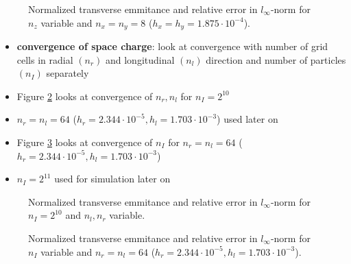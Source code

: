 \begin{center}
\begin{figure}[H]
   \begin{subfigure}{0.4\textwidth}
      
   \end{subfigure}
   \qquad \qquad \qquad
   \begin{subfigure}{0.4\textwidth}
      
   \end{subfigure}
   \caption{Normalized transverse emmitance and relative error in $l_\infty$-norm for $n_z$ variable and $n_x=n_y=8$ ($h_x=h_y=1.875 \cdot 10^{-4}$).}
   \label{fig:map_cvg_z}
\end{figure}
\end{center}

\newpage

\begin{itemize}
   \item \textbf{convergence of space charge}: look at convergence with number of grid cells in radial $(n_r)$ and longitudinal $(n_l)$ direction and number of particles $(n_I)$ separately

   \item Figure \ref{fig:sc_cvg_rl} looks at convergence of $n_r, n_l$ for $n_I=2^{10}$
   \item $n_r=n_l=64$ ($h_r=2.344 \cdot 10^{-5}, h_l=1.703 \cdot 10^{-3}$) used later on

   \item Figure \ref{fig:sc_cvg_I} looks at convergence of $n_I$ for $n_r=n_l=64$ ($h_r=2.344 \cdot 10^{-5}, h_l=1.703 \cdot 10^{-3}$)
   \item $n_I=2^{11}$ used for simulation later on
\end{itemize}

\begin{center}
\begin{figure}[H]
   \begin{subfigure}{0.4\textwidth}
      
   \end{subfigure}
   \qquad \qquad \qquad
   \begin{subfigure}{0.4\textwidth}
      
   \end{subfigure}
   \caption{Normalized transverse emmitance and relative error in $l_\infty$-norm for $n_I=2^{10}$ and $n_l, n_r$ variable.}
   \label{fig:sc_cvg_rl}
\end{figure}
\end{center}

\begin{center}
\begin{figure}[H]
   \begin{subfigure}{0.4\textwidth}
      
   \end{subfigure}
   \qquad \qquad \qquad
   \begin{subfigure}{0.4\textwidth}
      
   \end{subfigure}
   \caption{Normalized transverse emmitance and relative error in $l_\infty$-norm for $n_I$ variable and $n_r=n_l=64$ ($h_r=2.344 \cdot 10^{-5}, h_l=1.703 \cdot 10^{-3}$).}
   \label{fig:sc_cvg_I}
\end{figure}
\end{center}

